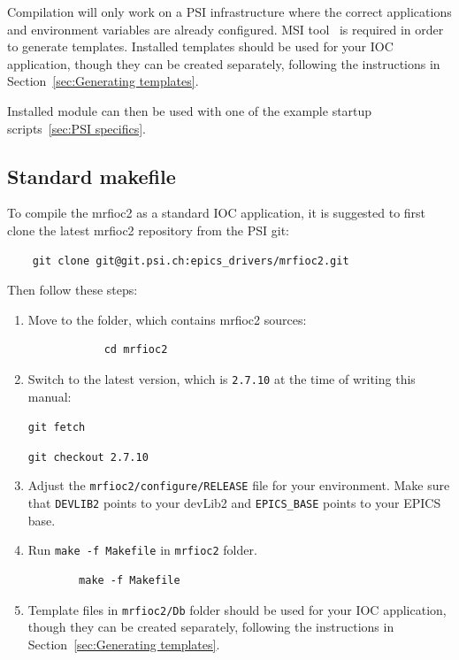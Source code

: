 \documentclass[12pt,a4paper]{article}
\newcommand{\latestDriverVersion}{2.7.10}
\begin{document}
Compilation will only work on a PSI infrastructure where the correct applications and environment variables are already configured. MSI tool~\cite{msi} is required in order to generate templates. Installed templates should be used for your IOC application, though they can be created separately, following the instructions in Section~\ref{sec:Generating templates}.

Installed module can then be used with one of the example startup scripts~\ref{sec:PSI specifics}.

\subsection{Standard makefile}\label{sec:Standard makefile}
To compile the mrfioc2 as a standard IOC application, it is suggested to first clone the latest mrfioc2 repository from the PSI git: 
\begin{verbatim}
	git clone git@git.psi.ch:epics_drivers/mrfioc2.git
\end{verbatim}

Then follow these steps:
\begin{enumerate}
	\item 
		Move to the folder, which contains mrfioc2 sources:
		\begin{verbatim}
			cd mrfioc2
		\end{verbatim}
		
	\item 
		Switch to the latest version, which is \texttt{\latestDriverVersion} at the time of writing this manual:
		
		\texttt{git fetch}
		
		\texttt{git checkout \latestDriverVersion}
		
	\item 
		Adjust the \texttt{mrfioc2/configure/RELEASE} file for your environment. Make sure that \texttt{DEVLIB2} points to your devLib2 and \texttt{EPICS\_BASE} points to your EPICS base.
	\item 
		Run \texttt{make -f Makefile} in \texttt{mrfioc2} folder.
		\begin{verbatim}
		make -f Makefile
		\end{verbatim}
	\item 
		Template files in \texttt{mrfioc2/Db} folder should be used for your IOC application, though they can be created separately, following the instructions in Section~\ref{sec:Generating templates}.
\end{enumerate}
\end{document}
